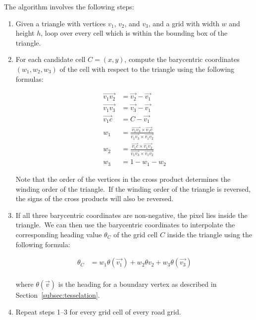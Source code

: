 The algorithm involves the following steps:

\begin{enumerate}
    \item Given a triangle with vertices $v_1$, $v_2$, and $v_3$, and a grid with width $w$ and height $h$, loop over every cell which is within the bounding box of the triangle.
    \item For each candidate cell $C=(x,y)$, compute the barycentric coordinates $(w_1, w_2, w_3)$ of the cell with respect to the triangle using the following formulas:

    \[
    \begin{aligned}
    \vec{v_1v_2} &= \vec{v_2} - \vec{v_1} \\
    \vec{v_1v_3} &= \vec{v_3} - \vec{v_1} \\
    \vec{v_1c} &= C - \vec{v_1} \\
    w_1 &= \frac{\vec{v_1v_3} \times \vec{v_1c}}{\vec{v_1v_3} \times \vec{v_1v_2}} \\
    w_2 &= \frac{\vec{v_1c} \times \vec{v_1v_2}}{\vec{v_1v_3} \times \vec{v_1v_2}} \\
    w_3 &= 1 - w_1 - w_2
    \end{aligned}
    \]

    Note that the order of the vertices in the cross product determines the winding order of the triangle.\ If the winding order of the triangle is reversed, the signs of the cross products will also be reversed.

    \item If all three barycentric coordinates are non-negative, the pixel lies inside the triangle.\ We can then use the barycentric coordinates to interpolate the corresponding heading value $\theta_C$ of the grid cell $C$ inside the triangle using the following formula:

    \[
    \begin{aligned}
    \theta_C &= w_1 \theta(\vec{v_1}) + w_2 \theta{v_2} + w_3 \theta(\vec{v_3}) \\
    \end{aligned}
    \]

    where $\theta(\vec{v})$ is the heading for a boundary vertex as described in Section~\ref{subsec:tesselation}.

    \item Repeat steps 1--3 for every grid cell of every road grid.

\end{enumerate}

